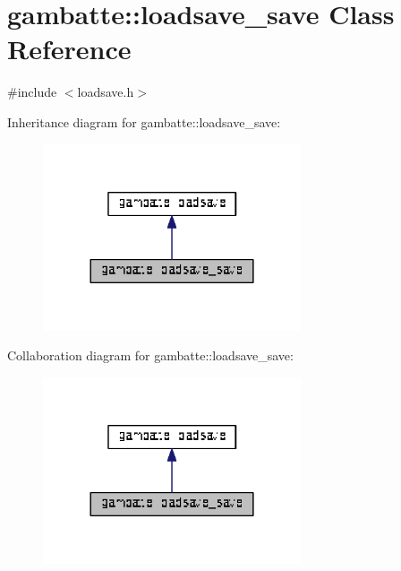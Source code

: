 \hypertarget{classgambatte_1_1loadsave__save}{}\section{gambatte\+:\+:loadsave\+\_\+save Class Reference}
\label{classgambatte_1_1loadsave__save}


{\ttfamily \#include $<$loadsave.\+h$>$}



Inheritance diagram for gambatte\+:\+:loadsave\+\_\+save\+:\nopagebreak
\begin{figure}[H]
\begin{center}
\leavevmode
\includegraphics[width=216pt]{classgambatte_1_1loadsave__save__inherit__graph}
\end{center}
\end{figure}


Collaboration diagram for gambatte\+:\+:loadsave\+\_\+save\+:\nopagebreak
\begin{figure}[H]
\begin{center}
\leavevmode
\includegraphics[width=216pt]{classgambatte_1_1loadsave__save__coll__graph}
\end{center}
\end{figure}
